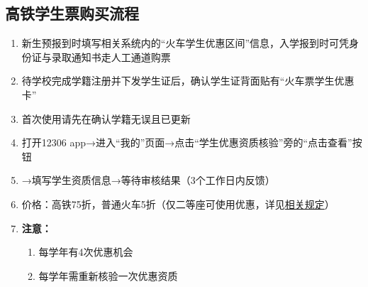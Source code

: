 \subsection[高铁学生票购买流程]{高铁学生票\footnotemark 购买流程}
\begin{enumerate}
    \item 新生预报到时填写相关系统内的“火车学生优惠区间”信息\footnotemark ，入学报到时可凭身份证与录取通知书走人工通道购票
    \item 待学校完成学籍注册并下发学生证后，确认学生证背面贴有“火车票学生优惠卡”\footnotemark
    \item 首次使用请先在确认学籍无误且已更新
    \item 打开12306 app→进入“我的”页面→点击“学生优惠资质核验”旁的“点击查看”按钮
    \item →填写学生资质信息→等待审核结果（3个工作日内反馈）
    \item 价格：高铁75折，普通火车5折（仅二等座可使用优惠，详见\href{https://kyfw.12306.cn/otn/gonggao/student.html}{相关规定}）
    \item \textbf{注意：}
          \begin{enumerate}
              \item 每学年\footnotemark 有4次优惠机会
              \item 每学年需重新核验\footnotemark 一次优惠资质
          \end{enumerate}
\end{enumerate}

